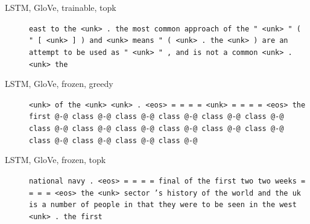 \begin{description}
\item[LSTM, GloVe, trainable, topk] \texttt{\small east to the \textless{}unk\textgreater{} . the most common approach of the " \textless{}unk\textgreater{} " ( " [ \textless{}unk\textgreater{} ] ) and \textless{}unk\textgreater{} means " ( \textless{}unk\textgreater{} . the \textless{}unk\textgreater{} ) are an attempt to be used as " \textless{}unk\textgreater{} " , and is not a common \textless{}unk\textgreater{} . \textless{}unk\textgreater{} the}
\item[LSTM, GloVe, frozen, greedy] \texttt{\small \textless{}unk\textgreater{} of the \textless{}unk\textgreater{} \textless{}unk\textgreater{} . \textless{}eos\textgreater{} = = = = \textless{}unk\textgreater{} = = = = \textless{}eos\textgreater{} the first @-@ class @-@ class @-@ class @-@ class @-@ class @-@ class @-@ class @-@ class @-@ class @-@ class @-@ class @-@ class @-@ class @-@ class @-@ class @-@}
\item[LSTM, GloVe, frozen, topk] \texttt{\small national navy . \textless{}eos\textgreater{} = = = = final of the first two two weeks = = = = \textless{}eos\textgreater{} the \textless{}unk\textgreater{} sector 's history of the world and the uk is a number of people in that they were to be seen in the west \textless{}unk\textgreater{} . the first}
\end{description}
